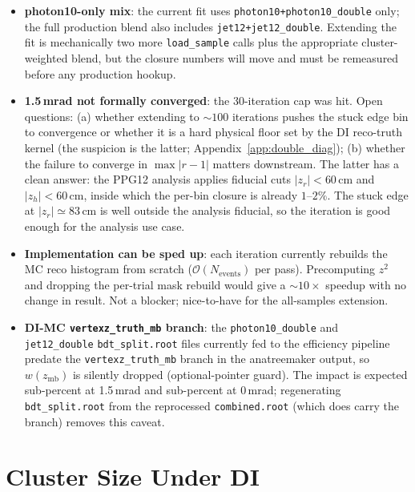 \documentclass[11pt,a4paper]{article}
\begin{document}
\begin{itemize}
\item \textbf{photon10-only mix}: the current fit uses
  \texttt{photon10+photon10\_double} only; the full production
  blend also includes \texttt{jet12+jet12\_double}. Extending the
  fit is mechanically two more \texttt{load\_sample} calls plus
  the appropriate cluster-weighted blend, but the closure numbers
  will move and must be remeasured before any production hookup.
\item \textbf{1.5\,mrad not formally converged}: the 30-iteration
  cap was hit. Open questions: (a) whether extending to
  $\sim\!100$ iterations pushes the stuck edge bin to convergence
  or whether it is a hard physical floor set by the DI
  reco-truth kernel (the suspicion is the latter;
  Appendix~\ref{app:double_diag}); (b) whether the failure to
  converge in $\max|r-1|$ matters downstream. The latter has a
  clean answer: the PPG12 analysis applies fiducial cuts
  $|z_r|<60$\,cm and $|z_h|<60$\,cm, inside which the per-bin
  closure is already $1$--$2\%$. The stuck edge at
  $|z_r|\simeq 83$\,cm is well outside the analysis fiducial, so
  the iteration is good enough for the analysis use case.
\item \textbf{Implementation can be sped up}: each iteration
  currently rebuilds the MC reco histogram from scratch
  ($\mathcal{O}(N_\mathrm{events})$ per pass). Precomputing $z^2$
  and dropping the per-trial mask rebuild would give a
  $\sim\!10\times$ speedup with no change in result. Not a
  blocker; nice-to-have for the all-samples extension.
\item \textbf{DI-MC \texttt{vertexz\_truth\_mb} branch}: the
  \texttt{photon10\_double} and \texttt{jet12\_double}
  \texttt{bdt\_split.root} files currently fed to the efficiency
  pipeline predate the \texttt{vertexz\_truth\_mb} branch in the
  anatreemaker output, so $w(z_\mathrm{mb})$ is silently dropped
  (optional-pointer guard). The impact is expected sub-percent at
  1.5\,mrad and sub-percent at 0\,mrad; regenerating
  \texttt{bdt\_split.root} from the reprocessed
  \texttt{combined.root} (which does carry the branch) removes
  this caveat.
\end{itemize}


\section{Cluster Size Under DI}
\label{sec:cluster_size}
\end{document}

